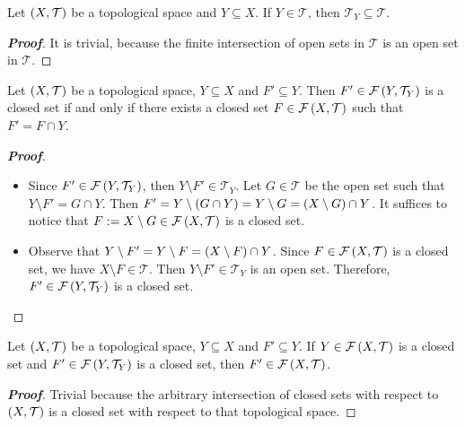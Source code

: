 \begin{proposition}
  Let $\left(X,\mathcal{T}\right)$ be a topological space and $Y\subseteq X$. If $Y\in\mathcal{T}$, then $\mathcal{T}_Y\subseteq\mathcal{T}$.
  \begin{proof}[\rm\textbf{Proof}]
  It is trivial, because the finite intersection of open sets in $\mathcal{T}$ is an open set in $\mathcal{T}$.
  \end{proof}
\end{proposition}

\begin{proposition}
  Let $\left(X,\mathcal{T}\right)$ be a topological space, $Y\subseteq X$ and $F'\subseteq Y$. Then $F'\in\mathcal{F}\left(Y,\mathcal{T}_Y\right)$ is a closed set if and only if there exists a closed set $F\in\mathcal{F}\left(X,\mathcal{T}\right)$ such that $F'=F\cap Y$.
  \begin{proof}[\rm\textbf{Proof}]
    \hfill
    \begin{itemize}
        \item[\boxed{\Rightarrow}] Since $F'\in\mathcal{F}\left(Y,\mathcal{T}_Y\right)$, then $Y\setminus F'\in\mathcal{T}_Y$. Let $G\in\mathcal{T}$ be the open set such that $Y\setminus F'=G\cap Y$. Then $F'=Y\setminus\left(G\cap Y\right)=Y\setminus G=\left(X\setminus G\right)\cap Y$. It suffices to notice that $F:=X\setminus G\in\mathcal{F}\left(X,\mathcal{T}\right)$ is a closed set.
        \item[\boxed{\Leftarrow}] Observe that $Y\setminus F'=Y\setminus F=\left(X\setminus F\right)\cap Y$. Since $F\in\mathcal{F}\left(X,\mathcal{T}\right)$ is a closed set, we have $X\setminus F\in\mathcal{T}$. Then $Y\setminus F'\in\mathcal{T}_Y$ is an open set. Therefore, $F'\in\mathcal{F}\left(Y,\mathcal{T}_Y\right)$ is a closed set.
    \end{itemize}
  \end{proof}
\end{proposition}

\begin{proposition}
  Let $\left(X,\mathcal{T}\right)$ be a topological space, $Y\subseteq X$ and $F'\subseteq Y$. If $Y\in\mathcal{F}\left(X,\mathcal{T}\right)$ is a closed set and $F'\in\mathcal{F}\left(Y,\mathcal{T}_Y\right)$ is a closed set, then $F'\in\mathcal{F}\left(X,\mathcal{T}\right)$.
  \begin{proof}[\rm\textbf{Proof}]
    Trivial because the arbitrary intersection of closed sets with respect to $\left(X,\mathcal{T}\right)$ is a closed set with respect to that topological space.
  \end{proof}
\end{proposition}

